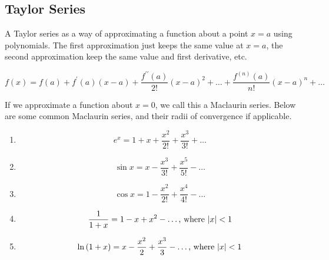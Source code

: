 \subsection{Taylor Series}
\noindent
A Taylor series as a way of approximating a function about a point $x=a$ using polynomials. The first approximation just keeps the same value at $x=a$, the second approximation keep the same value and first derivative, etc.
\begin{definition}
	\begin{equation*}
		f(x) = f(a)+f^\prime(a)(x-a) + \frac{f^{\prime\prime}(a)}{2!}(x-a)^2 + \ldots +  \frac{f^{(n)}(a)}{n!}(x-a)^n + \ldots
	\end{equation*}
\end{definition}
\noindent
If we approximate a function about $x=0$, we call this a Maclaurin series. Below are some common Maclaurin series, and their radii of convergence if applicable.
\begin{enumerate}[label=]
	\item \begin{equation*}
		e^x = 1 + x + \frac{x^2}{2!} + \frac{x^3}{3!} + \ldots
	\end{equation*}
	\item \begin{equation*}
		\sin{x} = x - \frac{x^3}{3!} + \frac{x^5}{5!} - \ldots
	\end{equation*}
	\item \begin{equation*}
		\cos{x} = 1 - \frac{x^2}{2!} + \frac{x^4}{4!} - \ldots
	\end{equation*}
	\item \begin{equation*}
		\frac{1}{1+x} = 1 - x + x^2 - \ldots \text{, where } \lvert x \rvert < 1
	\end{equation*}
	\item \begin{equation*}
		\ln{(1+x)} = x - \frac{x^2}{2} + \frac{x^3}{3} - \ldots \text{, where } \lvert x \rvert < 1
	\end{equation*}
\end{enumerate}


